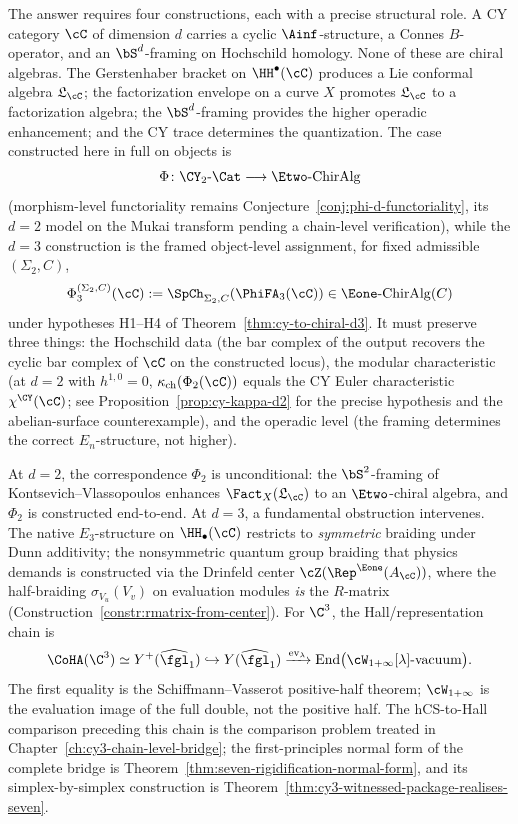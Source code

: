 The answer requires four constructions, each with a precise structural role. A CY category $\cC$ of dimension $d$ carries a cyclic $\Ainf$-structure, a Connes $B$-operator, and an $\bS^d$-framing on Hochschild homology. None of these are chiral algebras. The Gerstenhaber bracket on $\HH^\bullet(\cC)$ produces a Lie conformal algebra $\mathfrak{L}_\cC$; the factorization envelope on a curve $X$ promotes $\mathfrak{L}_\cC$ to a factorization algebra; the $\bS^d$-framing provides the higher operadic enhancement; and the CY trace determines the quantization. The case constructed here in full on objects is
\[
 \Phi \colon \CY_2\text{-}\Cat \longrightarrow \Etwo\text{-}\mathrm{ChirAlg}
\]
(morphism-level functoriality remains
Conjecture~\ref{conj:phi-d-functoriality}, its $d = 2$ model on the
Mukai transform pending a chain-level verification),
while the $d = 3$ construction is the framed object-level assignment, for fixed admissible $(\Sigma_2,C)$,
\[
 \Phi_3^{(\Sigma_2,C)}(\cC)
 :=
 \SpCh_{\Sigma_2,C}(\PhiFA_3(\cC))
 \in \Eone\text{-}\mathrm{ChirAlg}(C)
\]
under hypotheses \textup{H1--H4} of Theorem~\ref{thm:cy-to-chiral-d3}. It must preserve three things: the Hochschild data (the bar complex of the output recovers the cyclic bar complex of $\cC$ on the constructed locus), the modular characteristic (at $d = 2$ with $h^{1,0} = 0$, $\kappa_{\mathrm{ch}}(\Phi_2(\cC))$ equals the CY Euler characteristic $\chi^{\CY}(\cC)$; see Proposition~\ref{prop:cy-kappa-d2} for the precise hypothesis and the abelian-surface counterexample), and the operadic level (the framing determines the correct $E_n$-structure, not higher).

At $d = 2$, the correspondence $\Phi_2$ is unconditional: the $\bS^2$-framing of Kontsevich--Vlassopoulos enhances $\Fact_X(\mathfrak{L}_\cC)$ to an $\Etwo$-chiral algebra, and $\Phi_2$ is constructed end-to-end. At $d = 3$, a fundamental obstruction intervenes. The native $E_3$-structure on $\HH_\bullet(\cC)$ restricts to \emph{symmetric} braiding under Dunn additivity; the nonsymmetric quantum group braiding that physics demands is constructed via the Drinfeld center $\cZ(\Rep^{\Eone}(A_\cC))$, where the half-braiding $\sigma_{V_u}(V_v)$ on evaluation modules \emph{is} the $R$-matrix (Construction~\ref{constr:rmatrix-from-center}). For \(\C^3\), the Hall/representation chain is
\[
 \CoHA(\C^3)\simeq Y^+(\widehat{\fgl}_1)
 \hookrightarrow
 Y(\widehat{\fgl}_1)
 \xrightarrow{\mathrm{ev}_\lambda}
 \mathrm{End}\bigl(\cW_{1+\infty}[\lambda]\text{-vacuum}\bigr).
\]
The first equality is the Schiffmann--Vasserot positive-half theorem; \(\cW_{1+\infty}\) is the evaluation image of the full double, not the positive half. The hCS-to-Hall comparison preceding this chain is the comparison problem treated in Chapter~\ref{ch:cy3-chain-level-bridge}; the first-principles normal form of the complete bridge is Theorem~\ref{thm:seven-rigidification-normal-form}, and its simplex-by-simplex construction is Theorem~\ref{thm:cy3-witnessed-package-realises-seven}.

